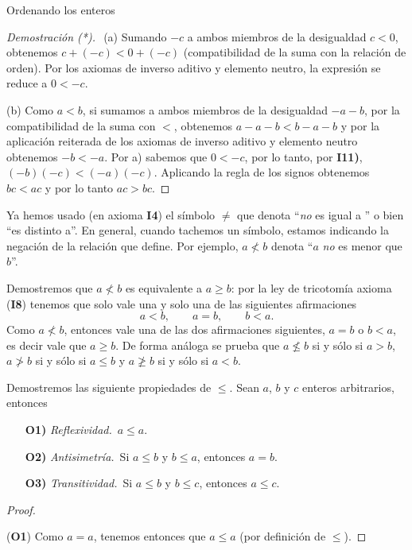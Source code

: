 \begin{section}{Ordenando los enteros}
\begin{proof}[Demostración (*)] {${}^{}$}
	(a) Sumando $-c$ a ambos miembros de la desigualdad $c < 0$, obtenemos $c + (-c) < 0 + (-c)$ (compatibilidad de la suma con la relación de orden). Por los axiomas de inverso aditivo y elemento neutro, la expresión se reduce a $0 < -c$.
	
	(b) Como $a < b$, si sumamos a ambos miembros de la desigualdad $-a -b$, por la compatibilidad  de la suma con $<$, obtenemos $a -a -b < b -a -b$ y por la aplicación reiterada de los axiomas de inverso aditivo y elemento neutro  obtenemos $-b < -a$. Por a) sabemos que $0< -c$, por lo tanto, por {\bf I11)}, $(-b)(-c) < (-a)(-c)$. Aplicando la regla de los signos obtenemos $bc < ac$ y por lo tanto $ac > bc$.

\end{proof}

Ya hemos usado (en axioma {\bf I4}) el símbolo $\not=$ que denota  ``{\em no} es igual a '' o bien ``es distinto a''.   En  general, cuando tachemos un símbolo, estamos indicando la negación de la relación que define. Por ejemplo, $a\not< b$ denota ``$a$ {\em no} es menor que $b$''. 

\begin{observacion} Demostremos que  $a\not< b$ es equivalente a $a\ge b$: por la ley de tricotomía axioma ({\bf I8}) tenemos que solo vale una y solo una de las siguientes afirmaciones
$$
a<b, \qquad a = b, \qquad b < a.
$$
Como  $a\not< b$, entonces vale una de las dos afirmaciones siguientes, $a=b$ o $b<a$, es decir  vale que $a \ge b$.
De forma análoga se prueba que $a\not\le b$ si  y sólo si $a>b$, $a\not> b$ si  y sólo si $a \le b$ y $a\not\ge b$ si  y sólo si $a<b$.

\end{observacion}


\begin{ejemplo}\label{relaciondeorden}
Demostremos las siguiente propiedades de $\le$. Sean  $a$, $b$ y $c$  enteros arbitrarios,  entonces
\begin{enumerate}
\item[{\bf O1)}] {\em Reflexividad.}\, $a \le a$.
\item[{\bf O2)}] {\em Antisimetría.}\, Si $a \le b$ y $b \le a$, entonces $a=b$.
\item[{\bf O3)}] {\em Transitividad.}\, Si $a\le b$ y $b\le c$, entonces $a \le c$.
\end{enumerate}
\begin{proof}
\
	
({\bf O1}) Como $a=a$, tenemos entonces que $a \le a$ (por definición de $\le$).


\end{proof}
\end{ejemplo}
\end{section}
